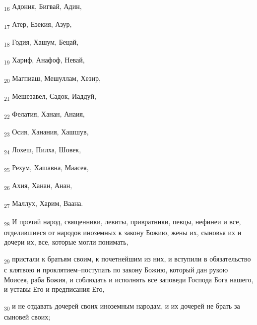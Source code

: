 \begin{tcolorbox}
\textsubscript{16} Адония, Бигвай, Адин,
\end{tcolorbox}
\begin{tcolorbox}
\textsubscript{17} Атер, Езекия, Азур,
\end{tcolorbox}
\begin{tcolorbox}
\textsubscript{18} Годия, Хашум, Бецай,
\end{tcolorbox}
\begin{tcolorbox}
\textsubscript{19} Хариф, Анафоф, Невай,
\end{tcolorbox}
\begin{tcolorbox}
\textsubscript{20} Магпиаш, Мешуллам, Хезир,
\end{tcolorbox}
\begin{tcolorbox}
\textsubscript{21} Мешезавел, Садок, Иаддуй,
\end{tcolorbox}
\begin{tcolorbox}
\textsubscript{22} Фелатия, Ханан, Анаия,
\end{tcolorbox}
\begin{tcolorbox}
\textsubscript{23} Осия, Ханания, Хашшув,
\end{tcolorbox}
\begin{tcolorbox}
\textsubscript{24} Лохеш, Пилха, Шовек,
\end{tcolorbox}
\begin{tcolorbox}
\textsubscript{25} Рехум, Хашавна, Маасея,
\end{tcolorbox}
\begin{tcolorbox}
\textsubscript{26} Ахия, Ханан, Анан,
\end{tcolorbox}
\begin{tcolorbox}
\textsubscript{27} Маллух, Харим, Ваана.
\end{tcolorbox}
\begin{tcolorbox}
\textsubscript{28} И прочий народ, священники, левиты, привратники, певцы, нефинеи и все, отделившиеся от народов иноземных к закону Божию, жены их, сыновья их и дочери их, все, которые могли понимать,
\end{tcolorbox}
\begin{tcolorbox}
\textsubscript{29} пристали к братьям своим, к почетнейшим из них, и вступили в обязательство с клятвою и проклятием--поступать по закону Божию, который дан рукою Моисея, раба Божия, и соблюдать и исполнять все заповеди Господа Бога нашего, и уставы Его и предписания Его,
\end{tcolorbox}
\begin{tcolorbox}
\textsubscript{30} и не отдавать дочерей своих иноземным народам, и их дочерей не брать за сыновей своих;
\end{tcolorbox}

